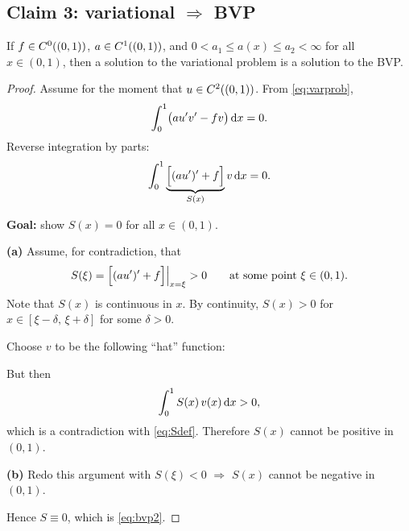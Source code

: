 \subsection*{Claim 3: variational $\Rightarrow$ BVP}

\begin{proposition}\label{prop:claim3}
If $f\in\Ck[(0,1)]{0}$, $a\in\Ck[(0,1)]{1}$, and
$0<a_{1}\le a(x)\le a_{2}<\infty$ for all $x\in(0,1)$, then a solution to the
variational problem is a solution to the BVP.
\end{proposition}

\begin{proof}
Assume for the moment that $u\in\Ck[(0,1)]{2}$. From \eqref{eq:varprob},
\begin{equation}
  \int_{0}^{1}\bigl(a u'v' - fv\bigr)\dx = 0 .
\end{equation}
Reverse integration by parts:
\begin{equation}\label{eq:Sdef}
  \int_{0}^{1}\underbrace{\Bigl[(au')' + f\Bigr]}_{S(x)} v\dx = 0 .
\end{equation}

\noindent\textbf{Goal:} show $S(x)=0$ for all $x\in(0,1)$.

\medskip
\noindent\textbf{(a)} Assume, for contradiction, that
\[
  S(\xi) = \Bigl[(au')'+f\Bigr]\Big|_{x=\xi} > 0
  \qquad\text{at some point } \xi\in(0,1).
\]
Note that $S(x)$ is continuous in $x$. By continuity, $S(x)>0$ for
$x\in[\xi-\delta,\,\xi+\delta]$ for some $\delta>0$.

Choose $v$ to be the following ``hat'' function:
\begin{center}
\end{center}
But then
\[
  \int_{0}^{1} S(x)\,v(x)\dx > 0,
\]
which is a contradiction with \eqref{eq:Sdef}. Therefore $S(x)$ cannot be
positive in $(0,1)$.

\medskip
\noindent\textbf{(b)} Redo this argument with $S(\xi)<0$
$\Rightarrow$ $S(x)$ cannot be negative in $(0,1)$.

\medskip
Hence $S\equiv0$, which is \eqref{eq:bvp2}.
\end{proof}

